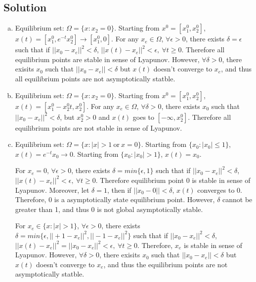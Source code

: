 \documentclass[11pt]{report}
\theoremstyle{definition}
\begin{document}
\subsection*{Solution}
\begin{enumerate}[(a), noitemsep]
\item
Equilibrium set: $\Omega = \{x: x_2=0\}$. Starting from $x^0 = [x_1^0, x_2^0]$, $x(t) = [x_1^0, e^{-t} x_2^0] \to [x_1^0, 0]$. For any $x_e \in \Omega$, $\forall \epsilon > 0$, there exists $\delta = \epsilon$ such that if $||x_0 - x_e||^2 < \delta$, $||x(t) - x_e||^2 < \epsilon,~\forall t \geq 0$. Therefore all equilibrium points are stable in sense of Lyapunov. However, $\forall \delta > 0$, there exisits $x_0$ such that $||x_0 - x_e|| < \delta$ but $x(t)$ doesn't converge to $x_e$, and thus all equilibrium points are not asymptotically statble.
\item
Equilibrium set: $\Omega = \{x: x_2=0\}$. Starting from $x^0 = [x_1^0, x_2^0]$, $x(t) = [x_1^0 - x_2^0 t, x_2^0]$. For any $x_e \in \Omega$, $\forall \delta > 0$, there exists $x_0$ such that $||x_0 - x_e||^2 < \delta$, but $x_2^0 > 0$ and $x(t)$ goes to $[-\infty, x_2^0]$. Therefore all equilibrium points are not stable in sense of Lyapunov.
\item
Equilibrium set: $\Omega = \{x: |x| > 1~\text{or}~x = 0\}$. Starting from $\{x_0: |x_0| \leq 1\}$, $x(t) = e^{-t} x_0 \to 0$. Starting from $\{x_0: |x_0| > 1\}$, $x(t) = x_0$.

For $x_e = 0$, $\forall \epsilon > 0$, there exists $\delta = min\{\epsilon, 1\}$ such that if $||x_0 - x_e||^2 < \delta$, $||x(t) - x_e||^2 < \epsilon,~\forall t \geq 0$. Therefore equilibrium point 0 is stable in sense of Lyapunov. Moreover, let $\delta = 1$, then if $||x_0 - 0|| < \delta$, $x(t)$ converges to 0. Therefore, 0 is a asymptotically state equilibrium point. However, $\delta$ cannot be greater than 1, and thus 0 is not global asymptotically stable.

For $x_e \in \{x: |x| > 1\}$, $\forall \epsilon > 0$, there exists $\delta = min\{\epsilon, ||+1-x_e||^2, ||-1-x_e||^2\}$ such that if $||x_0 - x_e||^2 < \delta$, $||x(t) - x_e||^2 = ||x_0 - x_e||^2 < \epsilon,~\forall t \geq 0$. Therefore, $x_e$ is stable in sense of Lyapunov. However, $\forall \delta > 0$, there exisits $x_0$ such that $||x_0 - x_e|| < \delta$ but $x(t)$ doesn't converge to $x_e$, and thus the equilibrium points are not asymptotically statble.
\end{enumerate}

\end{document}
